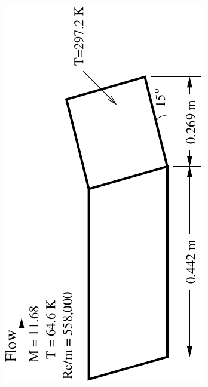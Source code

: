 \documentclass[compress,11pt]{beamer}
\begin{document}
{\begin{columns}[t]
\begin{center}
	\includegraphics[angle=270,width=\textwidth]{figures/holden_ramp/ramp}
      \end{center}
  \end{columns}
}
\end{document}
